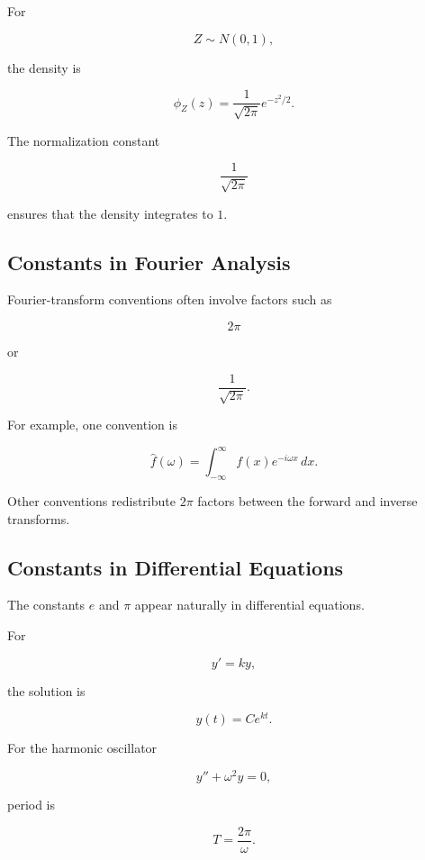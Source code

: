 For

\[
Z\sim N(0,1),
\]

the density is

\[
\boxed{
\phi_Z(z)
=
\frac{1}{\sqrt{2\pi}}
e^{-z^2/2}.
}
\]

The normalization constant

\[
\boxed{
\frac{1}{\sqrt{2\pi}}
}
\]

ensures that the density integrates to \(1\).

\subsection{Constants in Fourier Analysis}
\label{subsec:constants-in-fourier-analysis}

Fourier-transform conventions often involve factors such as

\[
\boxed{
2\pi
}
\]

or

\[
\boxed{
\frac{1}{\sqrt{2\pi}}.
}
\]

For example, one convention is

\[
\boxed{
\hat f(\omega)
=
\int_{-\infty}^{\infty}
f(x)e^{-i\omega x}\,dx.
}
\]

Other conventions redistribute \(2\pi\) factors between the forward and
inverse transforms.

\subsection{Constants in Differential Equations}
\label{subsec:constants-in-differential-equations}

The constants \(e\) and \(\pi\) appear naturally in differential equations.

For

\[
y'=ky,
\]

the solution is

\[
\boxed{
y(t)
=
Ce^{kt}.
}
\]

For the harmonic oscillator

\[
y''+\omega^2y=0,
\]

period is

\[
\boxed{
T
=
\frac{2\pi}{\omega}.
}
\]

